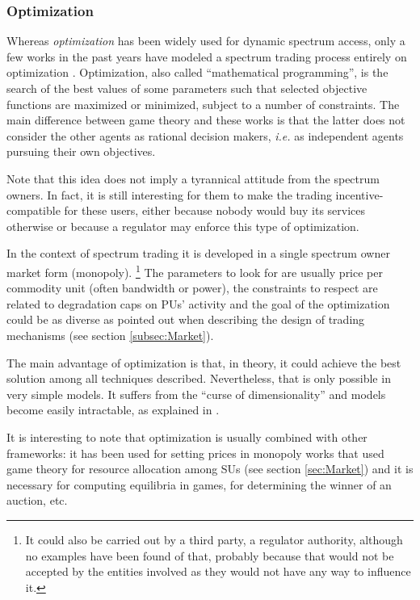 \subsubsection{Optimization}
\label{sec:Optimization}
Whereas \textit{optimization} has been widely used for dynamic spectrum access, only a few works in the past years have modeled a spectrum trading process entirely on optimization \cite{ref:Mutlu2008,ref:Yang2011}. Optimization, also called ``mathematical programming'', is the search of the best values of some parameters such that selected objective functions are maximized or minimized, subject to a number of constraints. 
The main difference between game theory and these works is that the latter does not consider the other agents as rational decision makers, \textit{i.e.} as independent agents pursuing their own objectives. 

Note that this idea does not imply a tyrannical attitude from the spectrum owners. 
In fact, it is still interesting for them to make the trading incentive-compatible for these users, either because nobody would buy its services otherwise or because a regulator may enforce this type of optimization.

In the context of spectrum trading it is developed in a single spectrum owner market form (monopoly). \footnote {It could also be carried out by a third party, a regulator authority, although no examples have been found of that, probably because that would not be accepted by the entities involved as they would not have any way to influence it.}
The parameters to look for are usually price per commodity unit (often bandwidth or power), the constraints to respect are related to degradation caps on PUs' activity and the goal of the optimization could be as diverse as pointed out when describing the design of trading mechanisms (see section \ref{subsec:Market}).

The main advantage of optimization is that, in theory, it could achieve the best solution among all techniques described. 
Nevertheless, that is only possible in very simple models. 
It suffers from the ``curse of dimensionality'' and models become easily intractable, as explained in \cite{ref:Ji2006}.

It is interesting to note that optimization is usually combined with other frameworks: it has been used for setting prices in monopoly works that used game theory for resource allocation among SUs (see section \ref{sec:Market}) and it is necessary for computing equilibria in games, for determining the winner of an auction, etc. 


